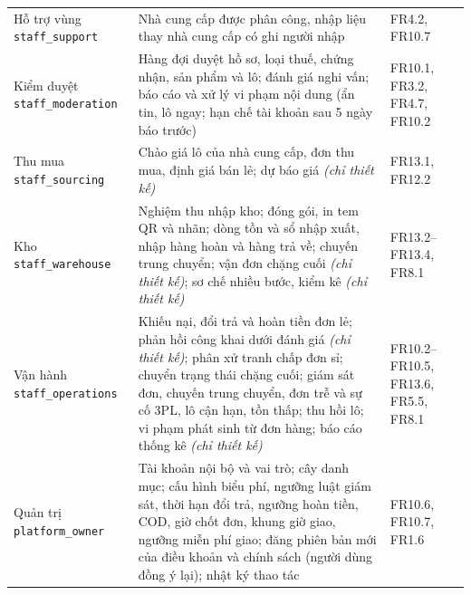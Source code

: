 \begin{longtable}{L{3.90cm} L{7.74cm} L{3.25cm}}
Hỗ trợ vùng \newline\texttt{staff\_support} & Nhà cung cấp được phân công, nhập liệu thay nhà cung cấp có ghi người nhập & FR4.2, FR10.7 \\
Kiểm duyệt \newline\texttt{staff\_moderation} & Hàng đợi duyệt hồ sơ, loại thuế, chứng nhận, sản phẩm và lô; đánh giá nghi vấn; báo cáo và xử lý vi phạm nội dung (ẩn tin, lô ngay; hạn chế tài khoản sau 5 ngày báo trước) & FR10.1, FR3.2, FR4.7, FR10.2 \\
Thu mua \newline\texttt{staff\_sourcing} & Chào giá lô của nhà cung cấp, đơn thu mua, định giá bán lẻ; dự báo giá \emph{(chỉ thiết kế)} & FR13.1, FR12.2 \\
Kho \newline\texttt{staff\_warehouse} & Nghiệm thu nhập kho; đóng gói, in tem QR và nhãn; dòng tồn và sổ nhập xuất, nhập hàng hoàn và hàng trả về; chuyến trung chuyển; vận đơn chặng cuối \emph{(chỉ thiết kế)}; sơ chế nhiều bước, kiểm kê \emph{(chỉ thiết kế)} & FR13.2--FR13.4, FR8.1 \\
Vận hành \newline\texttt{staff\_operations} & Khiếu nại, đổi trả và hoàn tiền đơn lẻ; phản hồi công khai dưới đánh giá \emph{(chỉ thiết kế)}; phân xử tranh chấp đơn sỉ; chuyển trạng thái chặng cuối; giám sát đơn, chuyến trung chuyển, đơn trễ và sự cố 3PL, lô cận hạn, tồn thấp; thu hồi lô; vi phạm phát sinh từ đơn hàng; báo cáo thống kê \emph{(chỉ thiết kế)} & FR10.2--FR10.5, FR13.6, FR5.5, FR8.1 \\
Quản trị \newline\texttt{platform\_owner} & Tài khoản nội bộ và vai trò; cây danh mục; cấu hình biểu phí, ngưỡng luật giám sát, thời hạn đổi trả, ngưỡng hoàn tiền, COD, giờ chốt đơn, khung giờ giao, ngưỡng miễn phí giao; đăng phiên bản mới của điều khoản và chính sách (người dùng đồng ý lại); nhật ký thao tác & FR10.6, FR10.7, FR1.6 \\
\end{longtable}
\endgroup
